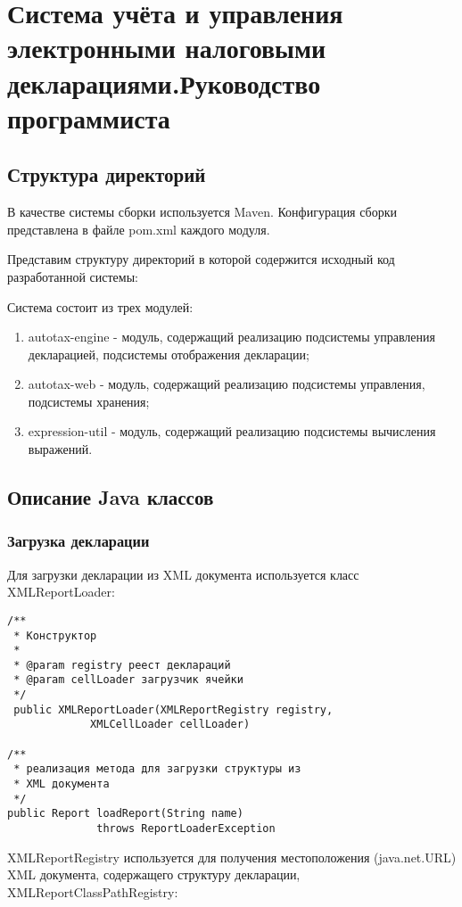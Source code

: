 \documentclass[14pt,a4paper]{reportmod}
\begin{document}
\chapter*{Система учёта и управления электронными налоговыми декларациями.Руководство программиста}
\setcounter{chapter}{1}

\section{Структура директорий}
В качестве системы сборки используется Maven. Конфигурация сборки представлена в файле pom.xml каждого модуля.

Представим структуру директорий в которой содержится исходный код разработанной системы:


Система состоит из трех модулей:
\begin{enumerate}
  \item autotax-engine - модуль, содержащий реализацию подсистемы управления декларацией, подсистемы отображения декларации;
  \item autotax-web - модуль, содержащий реализацию подсистемы управления, подсистемы хранения;
  \item expression-util - модуль, содержащий реализацию подсистемы вычисления выражений.
\end{enumerate}

\section{Описание Java классов}

\subsection{Загрузка декларации}
Для загрузки декларации из XML документа используется класс XMLReportLoader:
\begin{small}
\begin{verbatim}
/**
 * Конструктор
 *
 * @param registry реест деклараций
 * @param cellLoader загрузчик ячейки
 */
 public XMLReportLoader(XMLReportRegistry registry,
             XMLCellLoader cellLoader)

/**
 * реализация метода для загрузки структуры из
 * XML документа
 */
public Report loadReport(String name)
              throws ReportLoaderException
\end{verbatim}
\end{small}

XMLReportRegistry используется для получения местоположения (java.net.URL) XML документа, содержащего структуру декларации, XMLReportClassPathRegistry:
\end{document}
